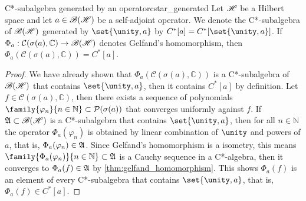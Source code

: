 \begin{proposition}{C*-subalgebra generated by an operator}{cstar_generated}
    Let \(\mathscr{H}\) be a Hilbert space and let \(a \in \mathscr{B}(\mathscr{H})\) be a self-adjoint operator. We denote the C*-subalgebra of \(\mathscr{B}(\mathscr{H})\) generated by \(\set{\unity, a}\) by \(C^*[a] = C^*[\set{\unity, a}]\). If \(\Phi_a : \mathcal{C}(\sigma(a), \mathbb{C}) \to \mathscr{B}(\mathscr{H})\) denotes Gelfand's homomorphism, then \(\Phi_a(\mathcal{C}(\sigma(a), \mathbb{C})) = C^*[a]\).
\end{proposition}
\begin{proof}
    We have already shown that \(\Phi_a(\mathcal{C}(\sigma(a), \mathbb{C}))\) is a C*-subalgebra of \(\mathscr{B}(\mathscr{H})\) that contains \(\set{\unity, a}\), then it contains \(C^*[a]\) by definition. Let \(f \in \mathcal{C}(\sigma(a), \mathbb{C})\), then there exists a sequence of polynomials \(\family{\varphi_n}{n \in \mathbb{N}} \subset \mathcal{P}(\sigma(a))\) that converges uniformly against \(f\). If \(\mathfrak{A} \subset \mathscr{B}(\mathscr{H})\) is a C*-subalgebra that contains \(\set{\unity,a}\), then for all \(n \in \mathbb{N}\) the operator \(\Phi_a(\varphi_n)\) is obtained by linear combination of \(\unity\) and powers of \(a\), that is, \(\Phi_a(\varphi_n) \in \mathfrak{A}\). Since Gelfand's homomorphism is a isometry, this means \(\family{\Phi_a(\varphi_n)}{n \in \mathbb{N}} \subset \algebra{A}\) is a Cauchy sequence in a C*-algebra, then it converges to \(\Phi_a(f) \in \mathfrak{A}\) by \cref{thm:gelfand_homomorphism}. This shows \(\Phi_a(f)\) is an element of every C*-subalgebra that contains \(\set{\unity, a}\), that is, \(\Phi_a(f) \in C^*[a]\).
\end{proof}

